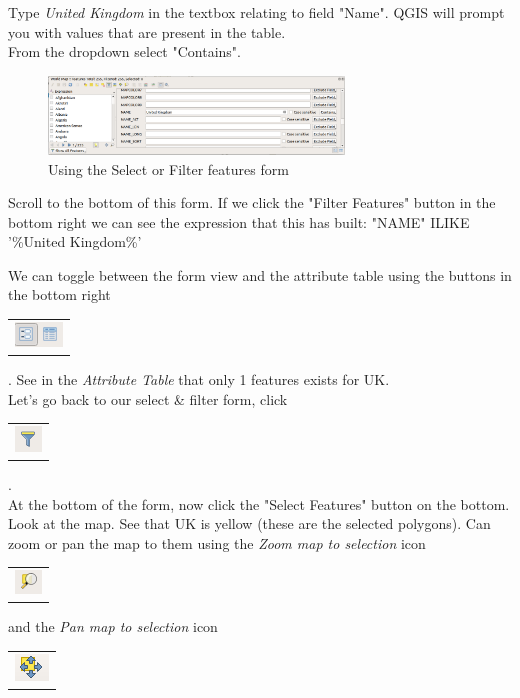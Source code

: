 \begin{enumerate}
	Type \textit{United Kingdom} in the textbox relating to field "Name". QGIS will prompt you with values that are present in the table.\\
	From the dropdown select "Contains".\\
	
	\begin{figure}[!h]
		\centering
		\includegraphics[width=0.7\textwidth]{images/select_filter_features_form_uk.png}
		\caption{Using the Select or Filter features form}
		\label{ft_fig_firstfig3}
	\end{figure}
	
	Scroll to the bottom of this form. If we click the "Filter Features" button in the bottom right we can see the expression that this has built: "NAME" ILIKE '\%United Kingdom\%'
	
	We can toggle between the form view and the attribute table using the buttons in the bottom right
	\begin{tabular}{@{}c@{}}\includegraphics[width=4ex]{images/form_table_icons.png}\end{tabular}. See in the \textit{Attribute Table} that only 1 features exists for UK.\\
	
	Let's go back to our select \& filter form, click  
	\begin{tabular}{@{}c@{}}\includegraphics[width=4ex]{images/select_features_form_icon.png}\end{tabular}.\\
	
	At the bottom of the form, now click the "Select Features" button on the bottom. Look at the map. See that UK is yellow (these are the selected polygons). Can zoom or pan the map to them using the \textit{Zoom map to selection} icon
	\begin{tabular}{@{}c@{}}\includegraphics[width=4ex]{images/zoom_map_to_selection_icon.png}\end{tabular}
	and the \textit{Pan map to selection} icon
	\begin{tabular}{@{}c@{}}\includegraphics[width=4ex]{images/pan_map_to_selection_icon.png}\end{tabular}
	

\end{enumerate}
